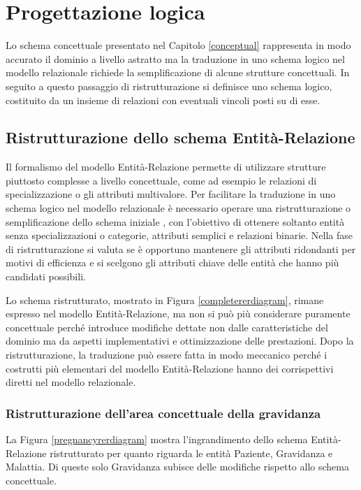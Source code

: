 \chapter{Progettazione logica}

Lo schema concettuale presentato nel Capitolo \ref{conceptual} rappresenta in modo accurato il dominio a livello astratto ma la traduzione in uno schema logico nel modello relazionale richiede la semplificazione di alcune strutture concettuali.
In seguito a questo passaggio di ristrutturazione si definisce uno schema logico, costituito da un insieme di relazioni con eventuali vincoli posti su di esse.

\section{Ristrutturazione dello schema Entità-Relazione}

Il formalismo del modello Entità-Relazione permette di utilizzare strutture piuttosto complesse a livello concettuale, come ad esempio le relazioni di specializzazione o gli attributi multivalore.
Per facilitare la traduzione in uno schema logico nel modello relazionale è necessario operare una ristrutturazione o semplificazione dello schema iniziale \cite{Atz23}, con l'obiettivo di ottenere soltanto entità senza specializzazioni o categorie, attributi semplici e relazioni binarie.
Nella fase di ristrutturazione si valuta se è opportuno mantenere gli attributi ridondanti per motivi di efficienza e si scelgono gli attributi chiave delle entità che hanno più candidati possibili.

Lo schema ristrutturato, mostrato in Figura \ref{completererdiagram}, rimane espresso nel modello Entità-Relazione, ma non si può più considerare puramente concettuale perché introduce modifiche dettate non dalle caratteristiche del dominio ma da aspetti implementativi e ottimizzazione delle prestazioni.
Dopo la ristrutturazione, la traduzione può essere fatta in modo meccanico perché i costrutti più elementari del modello Entità-Relazione hanno dei corrispettivi diretti nel modello relazionale.

\subsection{Ristrutturazione dell'area concettuale della gravidanza}

La Figura \ref{pregnancyrerdiagram} mostra l'ingrandimento dello schema Entità-Relazione ristrutturato per quanto riguarda le entità Paziente, Gravidanza e Malattia.
Di queste solo Gravidanza subisce delle modifiche rispetto allo schema concettuale.

